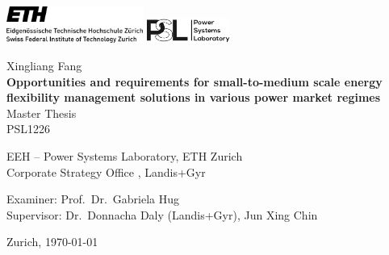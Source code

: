 \begin{titlepage}
\begin{center}

\includegraphics[height=12mm]{Figures/eth_logo_lang_pos}
\hfill
\includegraphics[height=8mm]{Figures/PSL_logo}

\vspace{30mm} Xingliang Fang \\
\vspace{10mm} \textbf{\LARGE Opportunities and requirements for small-to-medium scale energy flexibility management solutions in various power market regimes} \\
\vspace{10mm} Master Thesis \\ PSL1226


\vfill

EEH -- Power Systems Laboratory, ETH Zurich \\
Corporate Strategy Office , Landis+Gyr

\vspace{5mm}

Examiner: Prof.~Dr.~Gabriela Hug \\
Supervisor: Dr.~Donnacha Daly (Landis+Gyr), Jun Xing Chin


\vspace{5mm} Zurich, \today

\end{center}
\end{titlepage}

